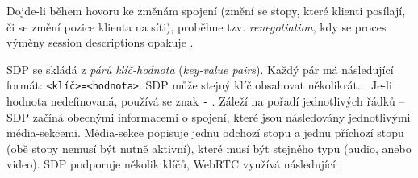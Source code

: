 Dojde-li během hovoru ke změnám spojení (změní se stopy, které klienti posílají,
či se změní pozice klienta na síti), proběhne tzv. \textit{renegotiation}, kdy
se proces výměny session descriptions opakuje
\cite{MozillaBlog-PerfectNegotiation}.

SDP se skládá z \textit{párů klíč-hodnota} (\textit{key-value pairs}). Každý pár
má následující formát: \texttt{<klíč>=<hodnota>}. SDP může stejný klíč
obsahovat několikrát. \cite{WebRTCForTheCurious}. Je-li hodnota nedefinovaná,
používá se znak \texttt{-} \cite{IETF-RFC8866}. Záleží na pořadí
jednotlivých řádků -- SDP začíná obecnými informacemi o spojení, které jsou
následovány jednotlivými média-sekcemi. Média-sekce popisuje jednu odchozí stopu
a jednu příchozí stopu (obě stopy nemusí být nutně aktivní), které musí být
stejného typu (audio, anebo video). SDP podporuje několik klíčů, WebRTC využívá
následující \cite{WebRTCForTheCurious,IETF-RFC8866}:

